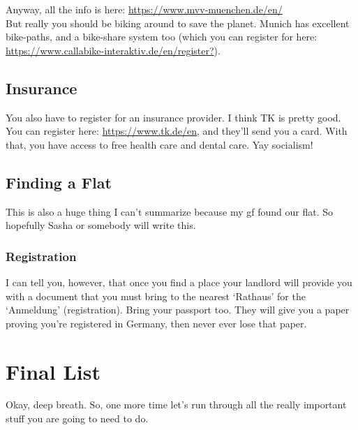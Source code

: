 \documentclass[11pt]{report}
\begin{document}
Anyway, all the info is here: \href{https://www.mvv-muenchen.de/en/}{https://www.mvv-muenchen.de/en/}\\

But really you should be biking around to save the planet. Munich has excellent bike-paths, and a bike-share system too (which you can register for here: \href{https://www.callabike-interaktiv.de/en/register?}{https://www.callabike-interaktiv.de/en/register?}).

\section{Insurance}
You also have to register for an insurance provider. I think TK is pretty good. You can register here: \href{https://www.tk.de/en}{https://www.tk.de/en}, and they'll send you a card. With that, you have access to free health care and dental care. Yay socialism!

\section{Finding a Flat}
This is also a huge thing I can't summarize because my gf found our flat. So hopefully Sasha or somebody will write this.

\subsection{Registration}
I can tell you, however, that once you find a place your landlord will provide you with a document that you must bring to the nearest `Rathaus' for the `Anmeldung' (registration). Bring your passport too. They will give you a paper proving you're registered in Germany, then never ever lose that paper.

\chapter{Final List}
Okay, deep breath. So, one more time let's run through all the really important stuff you are going to need to do.\\
\end{document}
